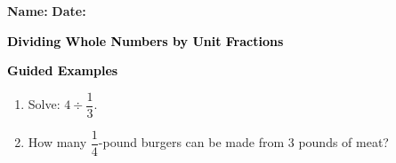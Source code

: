 \documentclass[12pt, letterpaper, fleqn]{article}
\begin{document}
\textbf{Name:} \underline{\hspace{5cm}}
\hfill
\textbf{Date:} \underline{\hspace{3cm}}\\

\begin{tcolorbox}[colback=customteal!20]
    \large\textcolor{black}{\textbf{Dividing Whole Numbers by Unit Fractions}}
\end{tcolorbox}
\newpage
\begin{tcolorbox}[colback=customteal!20]
    \large\textcolor{black}{\textbf{Guided Examples}}
\end{tcolorbox}
\begin{enumerate}[itemsep=3.5cm, leftmargin=0.6cm]
\item Solve: $4 \div \dfrac{1}{3}$.
\vspace{3cm}
\item How many $\dfrac{1}{4}$-pound burgers can be made from 3 pounds of meat?
\end{enumerate}
\end{document}
